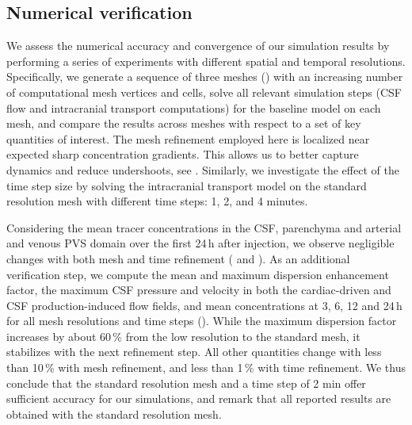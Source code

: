 \documentclass[fleqn,10pt]{wlscirep}
\begin{document}


\subsection{Numerical verification}
\label{sec:app:verification}

We assess the numerical accuracy and convergence of our simulation results by performing a series of experiments with different spatial and temporal resolutions. Specifically, we generate a sequence of three meshes () with an increasing number of computational mesh vertices and cells, solve all relevant simulation steps (CSF flow and intracranial transport computations) for the baseline model on each mesh, and compare the results across meshes with respect to a set of key quantities of interest. The mesh refinement employed here is localized near expected sharp concentration gradients. This allows us to better capture dynamics and reduce undershoots, see .  
Similarly, we investigate the effect of the time step size by solving the intracranial transport model on the standard resolution mesh with different time steps: 1, 2, and 4 minutes. 

Considering the mean tracer concentrations in the CSF, parenchyma and
arterial and venous PVS domain over the first 24\,h after injection,
we observe negligible changes with both mesh and time refinement
( and
). As an additional
verification step, we compute the mean and maximum dispersion
enhancement factor, the maximum CSF pressure and velocity in both the
cardiac-driven and CSF production-induced flow fields, and mean
concentrations at 3, 6, 12 and 24\,h for all mesh resolutions and time
steps (). While the maximum dispersion factor
increases by about 60\,\% from the low resolution to the standard mesh, it
stabilizes with the next refinement step. All other quantities change
with less than 10\,\% with mesh refinement, and less than 1\,\% with
time refinement. We thus conclude that the standard resolution mesh and a time step of 2 min offer sufficient accuracy for our simulations, and remark that all reported results are obtained with the standard resolution mesh. 
\end{document}

